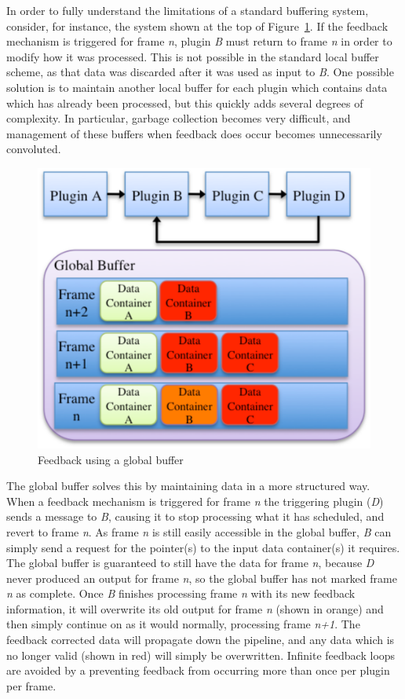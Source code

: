 In order to fully understand the limitations of a standard buffering system, consider, for instance, the system shown at the top of Figure~\ref{fig:Feedback}.  If the feedback mechanism is triggered for frame \emph{n}, plugin \emph{B} must return to frame \emph{n} in order to modify how it was processed. This is not possible in the standard local buffer scheme, as that data was discarded after it was used as input to \emph{B}. One possible solution is to maintain another local buffer for each plugin which contains data which has already been processed, but this quickly adds several degrees of complexity. In particular, garbage collection becomes very difficult, and management of these buffers when feedback does occur becomes unnecessarily convoluted.

\begin{figure}[t]
\begin{center}
\includegraphics[width=0.6\linewidth]{Feedback.pdf}
\end{center}
   \caption{Feedback using a global buffer}
\label{fig:Feedback}
\end{figure}

The global buffer solves this by maintaining data in a more structured way. When a feedback mechanism is triggered for frame \emph{n} the triggering plugin (\emph{D}) sends a message to \emph{B}, causing it to stop processing what it has scheduled, and revert to frame \emph{n}. As frame \emph{n} is still easily accessible in the global buffer, \emph{B} can simply send a request for the pointer(s) to the input data container(s) it requires. The global buffer is guaranteed to still have the data for frame \emph{n}, because \emph{D} never produced an output for frame \emph{n}, so the global buffer has not marked frame \emph{n} as complete. Once \emph{B} finishes processing frame \emph{n} with its new feedback information, it will overwrite its old output for frame \emph{n} (shown in orange) and then simply continue on as it would normally, processing frame \emph{n+1}. The feedback corrected data will propagate down the pipeline, and any data which is no longer valid (shown in red) will simply be overwritten. 
Infinite feedback loops are avoided by a preventing feedback from occurring more than once per plugin per frame.

